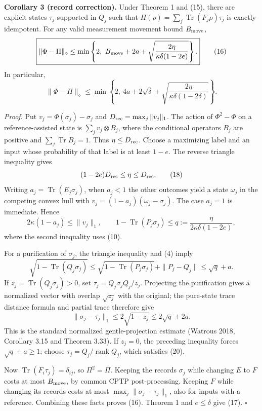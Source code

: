 \documentclass[
  11pt,
  a4paper,
]{article}
\begin{document}
\textbf{Corollary 3 (record correction).} Under Theorem 1 and (15),
there are explicit states \(\tau_j\) supported in \(Q_j\) such that
\(\Pi(\rho)=\sum_j\operatorname{Tr}(F_j\rho)\tau_j\) is exactly
idempotent. For any valid measurement movement bound \(B_{\rm move}\),
\[\boxed{\|\Phi-\Pi\|_\diamond\le
\min\left\{2,\ B_{\rm move}+2a+
\sqrt{\frac{2\eta}{\kappa\delta(1-2e)}}\right\}.}
\tag{16}\] In particular, \[\|\Phi-\Pi\|_\diamond\le
\min\left\{2,\ 4a+2\sqrt\delta+
\sqrt{\frac{2\eta}{\kappa\delta(1-2\delta)}}\right\}.
\tag{17}\]

\emph{Proof.} Put \(v_j=\Phi(\sigma_j)-\sigma_j\) and
\(D_{\rm rec}=\max_j\|v_j\|_1\). The action of \(\Phi^2-\Phi\) on a
reference-assisted state is \(\sum_jv_j\otimes B_j\), where the
conditional operators \(B_j\) are positive and
\(\sum_j\operatorname{Tr}B_j=1\). Thus \(\eta\le D_{\rm rec}\). Choose a
maximizing label and an input whose probability of that label is at
least \(1-e\). The reverse triangle inequality gives
\[(1-2e)D_{\rm rec}\le\eta\le D_{\rm rec}.
\tag{18}\] Writing \(a_j=\operatorname{Tr}(E_j\sigma_j)\), when
\(a_j<1\) the other outcomes yield a state \(\omega_j\) in the competing
convex hull with \(v_j=(1-a_j)(\omega_j-\sigma_j)\). The case \(a_j=1\)
is immediate. Hence \[2\kappa(1-a_j)\le\|v_j\|_1,\qquad
1-\operatorname{Tr}(P_j\sigma_j)\le
q:=\frac{\eta}{2\kappa\delta(1-2e)},
\tag{19}\] where the second inequality uses (10).

For a purification of \(\sigma_j\), the triangle inequality and (4)
imply \[\sqrt{1-\operatorname{Tr}(Q_j\sigma_j)}
\le\sqrt{1-\operatorname{Tr}(P_j\sigma_j)}+\|P_j-Q_j\|
\le\sqrt q+a.\] If \(z_j=\operatorname{Tr}(Q_j\sigma_j)>0\), set
\(\tau_j=Q_j\sigma_jQ_j/z_j\). Projecting the purification gives a
normalized vector with overlap \(\sqrt{z_j}\) with the original; the
pure-state trace distance formula and partial trace therefore give
\[\|\sigma_j-\tau_j\|_1\le2\sqrt{1-z_j}\le2\sqrt q+2a.
\tag{20}\] This is the standard normalized gentle-projection estimate
(Watrous 2018, Corollary 3.15 and Theorem 3.33). If \(z_j=0\), the
preceding inequality forces \(\sqrt q+a\ge1\); choose
\(\tau_j=Q_j/\operatorname{rank}Q_j\), which satisfies (20).

Now \(\operatorname{Tr}(F_i\tau_j)=\delta_{ij}\), so \(\Pi^2=\Pi\).
Keeping the records \(\sigma_j\) while changing \(E\) to \(F\) costs at
most \(B_{\rm move}\), by common CPTP post-processing. Keeping \(F\)
while changing its records costs at most
\(\max_j\|\sigma_j-\tau_j\|_1\), also for inputs with a reference.
Combining these facts proves (16). Theorem 1 and \(e\le\delta\) give
(17). \(\square\)
\end{document}
